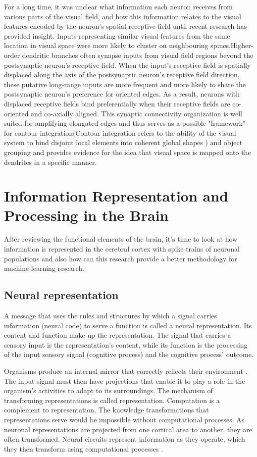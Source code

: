 \documentclass[12pt]{report}
\begin{document}
For a long time, it was unclear what information each neuron receives from various parts of the visual field, and how this information relates to the visual features encoded by the neuron's spatial receptive field until recent research has provided insight. Inputs representing similar visual features from the same location in visual space were more likely to cluster on neighbouring spines.Higher-order dendritic branches often synapse inputs from visual field regions beyond the postsynaptic neuron's receptive field. When the input's receptive field is spatially displaced along the axis of the postsynaptic neuron's receptive field direction, these putative long-range inputs are more frequent and more likely to share the postsynaptic neuron's preference for oriented edges. As a result, neurons with displaced receptive fields bind preferentially when their receptive fields are co-oriented and co-axially aligned. This synaptic connectivity organization is well suited for amplifying elongated edges and thus serves as a possible "framework" for contour integration(Contour integration refers to the ability of the visual system to bind disjoint local elements into coherent global shapes \cite{persike2016}) and object grouping \cite{Iacaruso2017} and provides evidence for the idea that visual space is mapped onto the dendrites in a specific manner.


\section{Information Representation and Processing in the Brain}
After reviewing the functional elements of the brain, it's time to look at how information is represented in the cerebral cortex with spike trains of neuronal populations and also how can this research provide a better methodology for machine learning research.
\subsection{Neural representation}
A message that uses the rules and structures by which a signal carries information (neural code) to serve a function is called a neural representation. Its content and function make up the representation. The signal that carries a sensory input is the representation's content, while its function is the processing of the input sensory signal (cognitive process) and the cognitive process' outcome.

Organisms produce an internal mirror that correctly reflects their environment \cite{Koch1994}. The input signal must then have projections that enable it to play a role in the organism's activities to adapt to its surroundings. The mechanism of transforming representations is called representation. Computation is a complement to representation. The knowledge transformations that representations serve would be impossible without computational processes. As neuronal representations are projected from one cortical area to another, they are often transformed. Neural circuits represent information as they operate, which they then transform using computational processes \cite{decharms2000}. 
\end{document}
